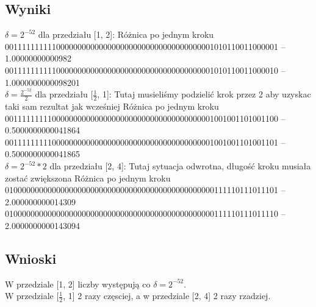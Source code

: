 \documentclass{article}
\begin{document}
\subsection{Wyniki}
	$\delta=2^{-52}$ dla przedziału [1, 2]: 
	Różnica po jednym kroku\\
	0011111111110000000000000000000000000000000000001010110011000001 -- 1.00000000000982\\
	0011111111110000000000000000000000000000000000001010110011000010 -- 1.0000000000098201\\
	$\delta=\frac{2^{-52}}{2}$ dla przedziału [$\frac{1}{2}$, 1]:
	Tutaj musieliśmy podzielić krok przez 2 aby uzyskac taki sam rezultat jak wcześniej 
	Różnica po jednym kroku\\
	0011111111100000000000000000000000000000000000001001001101001100 -- 0.5000000000041864\\
	0011111111100000000000000000000000000000000000001001001101001101 -- 0.5000000000041865\\
	$\delta=2^{-52} * 2$ dla przedziału [2, 4]:
	Tutaj sytuacja odwrotna, długość kroku musiała zostać zwiększona
	Różnica po jednym kroku\\
	0100000000000000000000000000000000000000000000000111110111011101 -- 2.000000000014309\\
	0100000000000000000000000000000000000000000000000111110111011110 -- 2.0000000000143094\\
\subsection{Wnioski}
	W przedziale [1, 2] liczby występują co $\delta=2^{-52}$.\\
	W przedziale [$\frac{1}{2}$, 1] 2 razy częsciej, a w przedziale [2, 4] 2 razy rzadziej.
\end{document}
